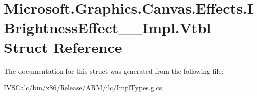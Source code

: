 \hypertarget{struct_microsoft_1_1_graphics_1_1_canvas_1_1_effects_1_1_i_brightness_effect_____impl_1_1_vtbl}{}\section{Microsoft.\+Graphics.\+Canvas.\+Effects.\+I\+Brightness\+Effect\+\_\+\+\_\+\+Impl.\+Vtbl Struct Reference}
\label{struct_microsoft_1_1_graphics_1_1_canvas_1_1_effects_1_1_i_brightness_effect_____impl_1_1_vtbl}


The documentation for this struct was generated from the following file\+:\begin{DoxyCompactItemize}
\item 
I\+V\+S\+Calc/bin/x86/\+Release/\+A\+R\+M/ilc/Impl\+Types.\+g.\+cs\end{DoxyCompactItemize}
